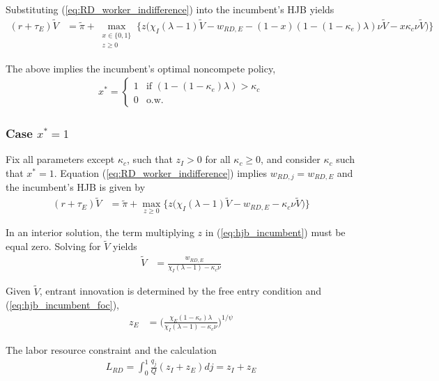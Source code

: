 \documentclass[12pt,english]{article}
\theoremstyle{remark}
\begin{document}
Substituting (\ref{eq:RD_worker_indifference}) into the incumbent's HJB yields
\begin{align}
	(r + \tau_E) \tilde{V} &= \tilde{\pi} + \max_{\substack{x \in \{0,1\} \\ z \ge 0}} \Big\{z \big(\chi_I (\lambda - 1) \tilde{V} - w_{RD,E} - (1-x) (1 - (1-\kappa_{e})\lambda)\nu \tilde{V} - x \kappa_{c} \nu \tilde{V}\big) \Big\} \label{eq:hjb_incumbent_workerIndiff}
\end{align}

The above implies the incumbent's optimal noncompete policy,
\begin{align}
x^* = \begin{cases}
1 & \textrm{if } (1-(1-\kappa_{e})\lambda) > \kappa_{c}\\
0 & \textrm{o.w.}
\end{cases} \label{eq_nca_policy}
\end{align}


\subsubsection{Case $x^* = 1$}

Fix all parameters except $\kappa_{c}$, such that $z_I > 0$ for all $\kappa_{c} \ge 0$, and consider $\kappa_{c}$ such that $x^* = 1$. Equation (\ref{eq:RD_worker_indifference}) implies $w_{RD,j} = w_{RD,E}$ and the incumbent's HJB is given by 
\begin{align}
(r + \tau_E) \tilde{V} &= \tilde{\pi} + \max_{z \ge 0} \Big\{z \big(\chi_I (\lambda - 1) \tilde{V} - w_{RD,E} - \kappa_{c} \nu \tilde{V}\big) \Big\} \label{eq:hjb_incumbent}
\end{align}

In an interior solution, the term multiplying $z$ in (\ref{eq:hjb_incumbent}) must be equal zero. Solving for $\tilde{V}$ yields
\begin{align}
	\tilde{V} &= \frac{w_{RD,E}}{\chi_I(\lambda - 1) - \kappa_{c} \nu} \label{eq:hjb_incumbent_foc}
\end{align}

Given $\tilde{V}$, entrant innovation is determined by the free entry condition and (\ref{eq:hjb_incumbent_foc}),
\begin{align}
	z_E &= \Big( \frac{\chi_E (1-\kappa_{e}) \lambda}{\chi_I(\lambda-1) - \kappa_c \nu } \Big)^{1/\psi} \label{eq:effort_entrant}
\end{align}

The labor resource constraint and the calculation
\begin{align}
	L_{RD} = \int_0^1 \frac{q_j}{Q} (z_{I} + z_{E}) dj = z_I + z_E
\end{align}
 
\end{document}
